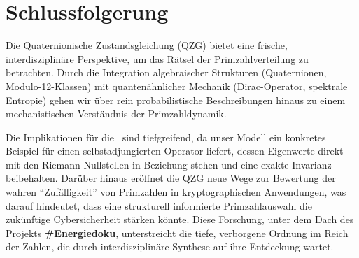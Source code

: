 \documentclass[11pt,twocolumn,a4paper]{article}
\newcommand{\HilPol}{\text{Hilbert-Pólya-Hypothese}}
\theoremstyle{definition}
\begin{document}
\section{Schlussfolgerung}
\label{sec:conclusion_de}
Die Quaternionische Zustandsgleichung (QZG) bietet eine frische, interdisziplinäre Perspektive, um das Rätsel der Primzahlverteilung zu betrachten. Durch die Integration algebraischer Strukturen (Quaternionen, Modulo-12-Klassen) mit quantenähnlicher Mechanik (Dirac-Operator, spektrale Entropie) gehen wir über rein probabilistische Beschreibungen hinaus zu einem mechanistischen Verständnis der Primzahldynamik.

Die Implikationen für die \HilPol\ sind tiefgreifend, da unser Modell ein konkretes Beispiel für einen selbstadjungierten Operator liefert, dessen Eigenwerte direkt mit den Riemann-Nullstellen in Beziehung stehen und eine exakte Invarianz beibehalten. Darüber hinaus eröffnet die QZG neue Wege zur Bewertung der wahren ``Zufälligkeit'' von Primzahlen in kryptographischen Anwendungen, was darauf hindeutet, dass eine strukturell informierte Primzahlauswahl die zukünftige Cybersicherheit stärken könnte. Diese Forschung, unter dem Dach des Projekts \textbf{\#Energiedoku}, unterstreicht die tiefe, verborgene Ordnung im Reich der Zahlen, die durch interdisziplinäre Synthese auf ihre Entdeckung wartet.

% 
% 
\end{document}
